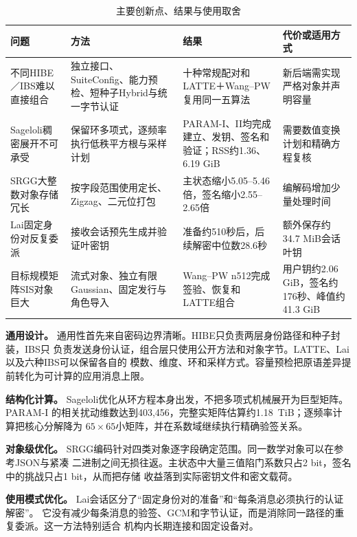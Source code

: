 \begin{table}[H]
\centering\small
\caption{主要创新点、结果与使用取舍}
\label{tab:innovation-summary}
\begin{tabularx}{\textwidth}{@{}>{\raggedright\arraybackslash}p{}>{\raggedright\arraybackslash}p{}>{\raggedright\arraybackslash}p{}>{\raggedright\arraybackslash}X@{}}
\toprule
\rowcolor{black!8} 问题 & 方法 & 结果 & 代价或适用方式 \\
\midrule
不同HIBE／IBS难以直接组合 & 独立接口、SuiteConfig、能力预检、短种子Hybrid与统一字节认证 & 十种常规配对和LATTE＋Wang--PW复用同一五算法 & 新后端需实现严格对象并声明容量 \\
Sageloli稠密展开不可承受 & 保留环多项式，逐频率执行低秩平方根与采样计划 & PARAM-I、II均完成建立、发钥、签名和验证；RSS约1.36、6.19 GiB & 需要数值变换计划和精确方程复核 \\
SRGG大整数对象存储冗长 & 按字段范围使用定长、Zigzag、二元位打包 & 主状态缩小5.05--5.46倍，签名缩小2.55--2.65倍 & 编解码增加少量处理时间 \\
Lai固定身份对反复委派 & 接收会话预先生成并验证叶密钥 & 准备约510秒后，后续解密中位数28.6秒 & 额外保存约34.7 MiB会话叶钥 \\
目标规模矩阵SIS对象巨大 & 流式对象、独立有限Gaussian、固定发行与角色导入 & Wang--PW n512完成签验、恢复和LATTE组合 & 用户钥约2.06 GiB，签名约176秒、峰值约41.3 GiB \\
\bottomrule
\end{tabularx}
\end{table}

\textbf{通用设计。} 通用性首先来自密码边界清晰。HIBE只负责两层身份路径和种子封装，IBS只
负责发送身份认证，组合层只使用公开方法和对象字节。LATTE、Lai以及六种IBS可以保留各自的
模数、维度、环和采样方式。容量预检把原语差异提前转化为可计算的应用消息上限。

\textbf{结构化计算。} Sageloli优化从环方程本身出发，不把多项式机械展开为巨型矩阵。PARAM-I
的相关扰动维数达到403,456，完整实矩阵估算约1.18~TiB；逐频率计算把核心分解降为
$65\times65$小矩阵，并在系数域继续执行精确验签关系。

\textbf{对象级优化。} SRGG编码针对四类对象逐字段确定范围。同一数学对象可以在参考JSON与紧凑
二进制之间无损往返。主状态中大量三值陷门系数只占2 bit，签名中的挑战只占1 bit，从而把存储
收益落到实际密钥文件和密文载荷。

\textbf{使用模式优化。} Lai会话区分了“固定身份对的准备”和“每条消息必须执行的认证解密”。
它没有减少每条消息的验签、GCM和字节认证，而是消除同一路径的重复委派。这一方法特别适合
机构内长期连接和固定设备对。

